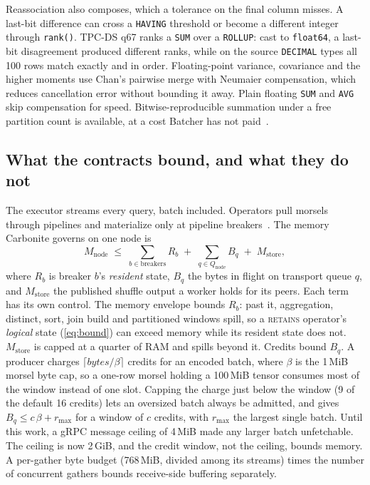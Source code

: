 \documentclass[10pt,twocolumn,letterpaper]{article}   %
\newcommand{\sys}{Batcher}
\newcommand{\carbo}{Carbonite}
\begin{document}
Reassociation also composes, which a tolerance on the final column misses. A last-bit
difference can cross a \texttt{HAVING} threshold or become a different integer through
\texttt{rank()}. TPC-DS q67 ranks a \texttt{SUM} over a \texttt{ROLLUP}: cast to
\texttt{float64}, a last-bit disagreement produced different ranks, while on the source
\texttt{DECIMAL} types all 100 rows match exactly and in order. Floating-point variance,
covariance and the higher moments use Chan's pairwise merge with Neumaier compensation, which
reduces cancellation error without bounding it away. Plain floating \texttt{SUM} and
\texttt{AVG} skip compensation for speed. Bitwise-reproducible summation under a free partition
count is available, at a cost \sys{} has not paid~\cite{demmel2013reproducible}.

\subsection{What the contracts bound, and what they do not}
\label{sec:memory}

The executor streams every query, batch included. Operators pull morsels through pipelines
and materialize only at pipeline breakers~\cite{leis2014morsel}. The memory \carbo{} governs
on one node is
\begin{equation}
M_{\text{node}} \;\le\; \sum_{b \in \text{breakers}} R_b \;+\; \sum_{q \in Q_{\text{node}}} B_q
\;+\; M_{\text{store}},
\label{eq:mem}
\end{equation}
where $R_b$ is breaker $b$'s \emph{resident} state, $B_q$ the bytes in flight on transport
queue $q$, and $M_{\text{store}}$ the published shuffle output a worker holds for its peers.
Each term has its own control. The memory envelope bounds $R_b$: past it, aggregation,
distinct, sort, join build and partitioned windows spill, so a \textsc{retains} operator's
\emph{logical} state (\cref{eq:bound}) can exceed memory while its resident state does not.
$M_{\text{store}}$ is capped at a quarter of RAM and spills beyond it. Credits bound $B_q$. A
producer charges $\lceil \mathit{bytes}/\beta \rceil$ credits for an encoded batch, where
$\beta$ is the 1\,MiB morsel byte cap, so a one-row morsel holding a 100\,MiB tensor consumes
most of the window instead of one slot. Capping the charge just below the window (9 of the
default 16 credits) lets an oversized batch always be admitted, and gives
$B_q \le c\,\beta + r_{\max}$ for a window of $c$ credits, with $r_{\max}$ the largest single
batch. Until this work, a gRPC message ceiling of 4\,MiB made any larger batch unfetchable. The
ceiling is now 2\,GiB, and the credit window, not the ceiling, bounds memory. A per-gather
byte budget (768\,MiB, divided among its streams) times the number of concurrent gathers
bounds receive-side buffering separately.
\end{document}
